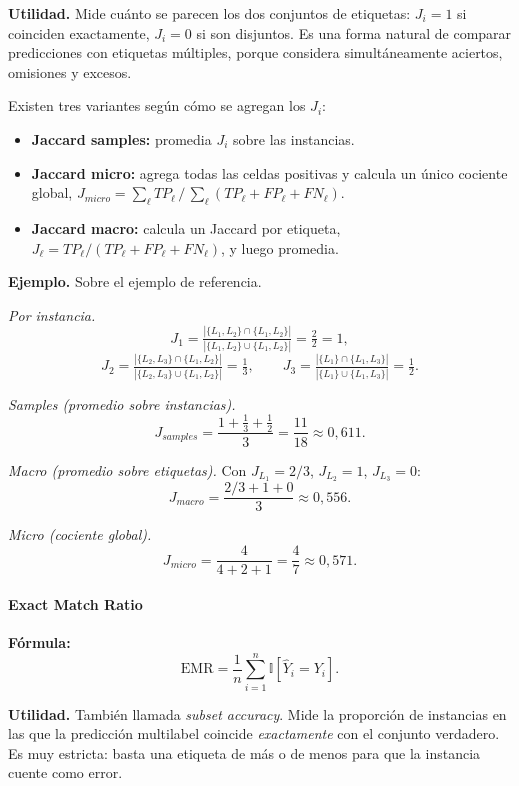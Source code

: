 \documentclass[12pt,oneside]{report}
\newcommand{\ind}{\mathbb{I}} %
\begin{document}
\textbf{Utilidad.} Mide cuánto se parecen los dos conjuntos de
etiquetas: $J_i=1$ si coinciden exactamente, $J_i=0$ si son disjuntos.
Es una forma natural de comparar predicciones con etiquetas múltiples,
porque considera simultáneamente aciertos, omisiones y excesos.

Existen tres variantes según cómo se agregan los $J_i$:
\begin{itemize}[leftmargin=*]
  \item \textbf{Jaccard samples:} promedia $J_i$ sobre las instancias.
  \item \textbf{Jaccard micro:} agrega todas las celdas positivas y
  calcula un único cociente global, $J_{micro}=\sum_\ell TP_\ell\,/\,\sum_\ell(TP_\ell+FP_\ell+FN_\ell)$.
  \item \textbf{Jaccard macro:} calcula un Jaccard por etiqueta,
  $J_\ell=TP_\ell/(TP_\ell+FP_\ell+FN_\ell)$, y luego promedia.
\end{itemize}

\textbf{Ejemplo.} Sobre el ejemplo de referencia.

\emph{Por instancia.}
\[
J_1=\tfrac{|\{L_1,L_2\}\cap\{L_1,L_2\}|}{|\{L_1,L_2\}\cup\{L_1,L_2\}|}=\tfrac{2}{2}=1,
\]
\[
J_2=\tfrac{|\{L_2,L_3\}\cap\{L_1,L_2\}|}{|\{L_2,L_3\}\cup\{L_1,L_2\}|}=\tfrac{1}{3},\qquad
J_3=\tfrac{|\{L_1\}\cap\{L_1,L_3\}|}{|\{L_1\}\cup\{L_1,L_3\}|}=\tfrac{1}{2}.
\]

\emph{Samples (promedio sobre instancias).}
\[
J_{samples}=\frac{1+\tfrac{1}{3}+\tfrac{1}{2}}{3}=\frac{11}{18}\approx 0{,}611.
\]

\emph{Macro (promedio sobre etiquetas).} Con $J_{L_1}=2/3$,
$J_{L_2}=1$, $J_{L_3}=0$:
\[
J_{macro}=\frac{2/3+1+0}{3}\approx 0{,}556.
\]

\emph{Micro (cociente global).}
\[
J_{micro}=\frac{4}{4+2+1}=\frac{4}{7}\approx 0{,}571.
\]

\paragraph{Exact Match Ratio}

\textbf{Fórmula:}
\[
\mathrm{EMR}=\frac{1}{n}\sum_{i=1}^n \ind[\hat{Y}_i = Y_i].
\]

\textbf{Utilidad.} También llamada \emph{subset accuracy}. Mide la
proporción de instancias en las que la predicción multilabel coincide
\emph{exactamente} con el conjunto verdadero. Es muy estricta: basta una
etiqueta de más o de menos para que la instancia cuente como error.
\end{document}
